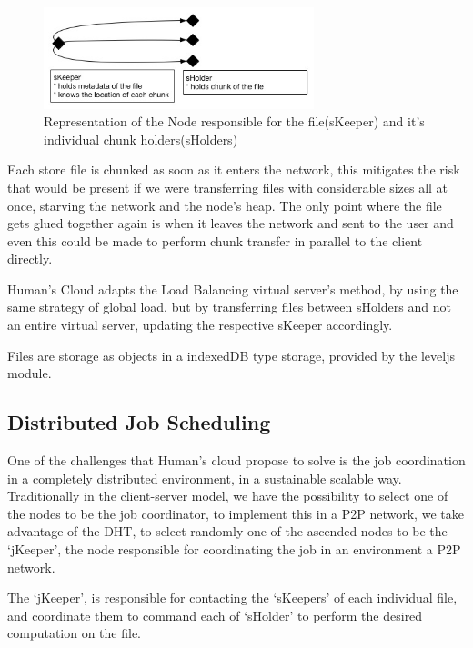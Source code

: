 \begin{figure}[h!]
  \centering
  \includegraphics[width=0.7\textwidth]{img/skeepersholder.jpg}
  \caption{Representation of the Node responsible for the file(sKeeper) and it's individual chunk holders(sHolders)}
  \label{fig:skeepersholder}
\end{figure}

Each store file is chunked as soon as it enters the network, this mitigates the risk that would be present if we were transferring files with considerable sizes all at once, starving the network and the node's heap. The only point where the file gets glued together again is when it leaves the network and sent to the user and even this could be made to perform chunk transfer in parallel to the client directly.

Human's Cloud adapts the Load Balancing virtual server's method, by using the same strategy of global load, but by transferring files between sHolders and not an entire virtual server, updating the respective sKeeper accordingly. 

Files are storage as objects in a indexedDB type storage, provided by the leveljs module. 

\subsection{Distributed Job Scheduling}

One of the challenges that Human's cloud propose to solve is the job coordination in a completely distributed environment, in a sustainable scalable way. Traditionally in the client-server model, we have the possibility to select one of the nodes to be the job coordinator, to implement this in a P2P network, we take advantage of the DHT, to select randomly one of the ascended nodes to be the `jKeeper', the node responsible for coordinating the job in an environment a P2P network.

The `jKeeper', is responsible for contacting the `sKeepers' of each individual file, and coordinate them to command each of `sHolder' to perform the desired computation on the file.

